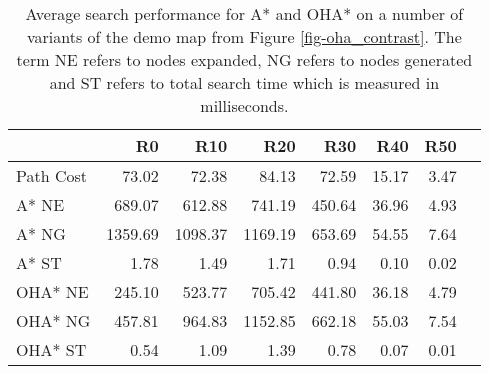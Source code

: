 \begin{table}
\begin{center}
\label{table-csc2f}
\begin{tabular}{@{}lrrrrrrr@{}}
  \hline
 & R0 & R10 & R20 & R30 & R40 & R50 \\ 
  \hline
Path Cost & 73.02 & 72.38 & 84.13 & 72.59 & 15.17 & 3.47 \\ 
A* NE & 689.07 & 612.88 & 741.19 & 450.64 & 36.96 & 4.93 \\ 
A* NG & 1359.69 & 1098.37 & 1169.19 & 653.69 & 54.55 & 7.64 \\ 
A* ST & 1.78 & 1.49 & 1.71 & 0.94 & 0.10 & 0.02 \\ 
OHA* NE & 245.10 & 523.77 & 705.42 & 441.80 & 36.18 & 4.79 \\ 
OHA* NG & 457.81 & 964.83 & 1152.85 & 662.18 & 55.03 & 7.54 \\ 
OHA* ST & 0.54 & 1.09 & 1.39 & 0.78 & 0.07 & 0.01 \\ 
   \hline
\end{tabular}
\vspace{-2em}
\caption{Average search performance for A* and OHA* on a number of variants of the demo
map from Figure \ref{fig-oha_contrast}.
The term NE refers to nodes expanded, NG refers to nodes generated and ST refers to total 
search time which is measured in milliseconds.}
\end{center}
\vspace{-1.5em}
\end{table}
